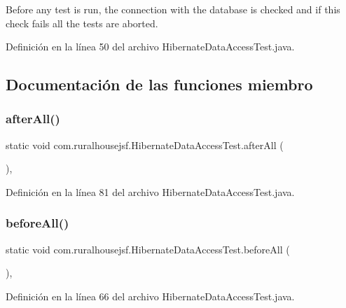 Before any test is run, the connection with the database is checked and if this check fails all the tests are aborted. 

Definición en la línea 50 del archivo Hibernate\+Data\+Access\+Test.\+java.



\subsection{Documentación de las funciones miembro}
\mbox{\label{a00272_ad178c485d2837875d915e6876d29862c}} 
\subsubsection{\texorpdfstring{afterAll()}{afterAll()}}
{\footnotesize\ttfamily static void com.\+ruralhousejsf.\+Hibernate\+Data\+Access\+Test.\+after\+All (\begin{DoxyParamCaption}{ }\end{DoxyParamCaption})\hspace{0.3cm}{\ttfamily [static]}, {\ttfamily [package]}}



Definición en la línea 81 del archivo Hibernate\+Data\+Access\+Test.\+java.

\mbox{\label{a00272_a385a9a721138e301ab9b775298eff369}} 
\subsubsection{\texorpdfstring{beforeAll()}{beforeAll()}}
{\footnotesize\ttfamily static void com.\+ruralhousejsf.\+Hibernate\+Data\+Access\+Test.\+before\+All (\begin{DoxyParamCaption}{ }\end{DoxyParamCaption})\hspace{0.3cm}{\ttfamily [static]}, {\ttfamily [package]}}



Definición en la línea 66 del archivo Hibernate\+Data\+Access\+Test.\+java.


